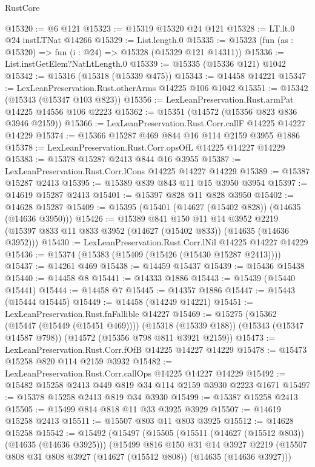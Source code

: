 \begin{lexlean}{RustCore}
\begin{coremodule}
@15320 := @6 @121
@15323 := @15319 @15320 @24 @121
@15328 := LT.lt.{0} @24 instLTNat @14266
@15329 := List.length.{0}
@15335 := @15323 (fun (as : @15320) => fun (i : @24) => @15328 (@15329 @121 @14311))
@15336 := List.instGetElem?NatLtLength.{0}
@15339 := @15335 (@15336 @121) @1042
@15342 := @15316 (@15318 (@15339 @475))
@15343 := @14458 @14221
@15347 := LexLeanPreservation.Rust.otherArms @14225 @106 @1042
@15351 := @15342 (@15343 (@15347 @103 @823))
@15356 := LexLeanPreservation.Rust.armPat @14225 @14556 @106 @2223
@15362 := @15351 (@14572 (@15356 @823 @836 @3946 @2159))
@15366 := LexLeanPreservation.Rust.Corr.callF @14225 @14227 @14229
@15374 := @15366 @15287 @469 @844 @16 @114 @2159 @3955 @1886
@15378 := LexLeanPreservation.Rust.Corr.opsOfL @14225 @14227 @14229
@15383 := @15378 @15287 @2413 @844 @16 @3955
@15387 := LexLeanPreservation.Rust.Corr.lCons @14225 @14227 @14229
@15389 := @15387 @15287 @2413
@15395 := @15389 @839 @843 @11 @15 @3950 @3954
@15397 := @14619 @15287 @2413
@15401 := @15397 @828 @11 @828 @3950
@15402 := @14628 @15287
@15409 := @15395 (@15401 (@14627 (@15402 @828)) (@14635 (@14636 @3950)))
@15426 := @15389
    @841
    @150
    @11
    @14
    @3952
    @2219
    (@15397 @833 @11 @833 @3952 (@14627 (@15402 @833)) (@14635 (@14636 @3952)))
@15430 := LexLeanPreservation.Rust.Corr.lNil @14225 @14227 @14229
@15436 := @15374 (@15383 (@15409 (@15426 (@15430 @15287 @2413))))
@15437 := @14261 @469
@15438 := @14459 @15437
@15439 := @15436 @15438
@15440 := @14458 @8
@15441 := @14333 @1886
@15443 := @15439 (@15440 @15441)
@15444 := @14458 @7
@15445 := @14357 @1886
@15447 := @15443 (@15444 @15445)
@15449 := @14458 (@14249 @14221)
@15451 := LexLeanPreservation.Rust.fnFallible @14227
@15469 := @15275
    (@15362 (@15447 (@15449 (@15451 @469))))
    (@15318 (@15339 @188))
    (@15343 (@15347 @14587 @798))
    (@14572 (@15356 @798 @811 @3921 @2159))
@15473 := LexLeanPreservation.Rust.Corr.fOfB @14225 @14227 @14229
@15478 := @15473 @15258 @820 @114 @2159 @3932
@15482 := LexLeanPreservation.Rust.Corr.callOps @14225 @14227 @14229
@15492 := @15482 @15258 @2413 @449 @819 @34 @114 @2159 @3930 @2223 @1671
@15497 := @15378 @15258 @2413 @819 @34 @3930
@15499 := @15387 @15258 @2413
@15505 := @15499 @814 @818 @11 @33 @3925 @3929
@15507 := @14619 @15258 @2413
@15511 := @15507 @803 @11 @803 @3925
@15512 := @14628 @15258
@15542 := @15492
    (@15497
      (@15505
        (@15511 (@14627 (@15512 @803)) (@14635 (@14636 @3925)))
        (@15499
          @816
          @150
          @31
          @14
          @3927
          @2219
          (@15507 @808 @31 @808 @3927 (@14627 (@15512 @808)) (@14635 (@14636 @3927)))

\end{coremodule}
\end{lexlean}
